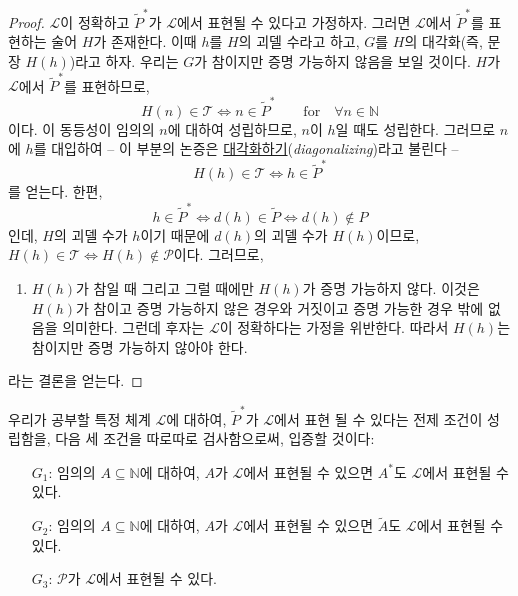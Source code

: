 \documentclass[12pt]{paper}
\begin{document}
  \begin{proof}
    $\mathcal{L}$이 정확하고 $\tilde{P}^{*}$가 $\mathcal{L}$에서 표현될 수 있다고 가정하자.
    그러면 $\mathcal{L}$에서 $\tilde{P}^{*}$를 표현하는 술어 $H$가 존재한다.
    이때 $h$를 $H$의 괴델 수라고 하고,
    $G$를 $H$의 대각화(즉, 문장 $ H \left( h \right) $)라고 하자.
    우리는 $G$가 참이지만 증명 가능하지 않음을 보일 것이다.
    $H$가 $\mathcal{L}$에서 $\tilde{P}^{*}$를 표현하므로,
    $$ H \left( n \right) \in \mathcal{T} \iff n \in \tilde{P}^{*} \qquad \mathrm{for} \quad \forall n \in \mathbb{N} $$이다.
    이 동등성이 임의의 $n$에 대하여 성립하므로,
    $n$이 $h$일 때도 성립한다.
    그러므로 $n$에 $h$를 대입하여 --
    이 부분의 논증은 \underline{대각화하기}(\textit{diagonalizing})라고 불린다 --
    $$ H \left( h \right) \in \mathcal{T} \iff h \in \tilde{P}^{*}$$를 얻는다.
    한편, $$h \in \tilde{P}^{*} \iff d \left( h \right) \in \tilde{P} \iff d \left( h \right) \notin P$$인데,
    $H$의 괴델 수가 $h$이기 때문에 $d \left( h \right)$의 괴델 수가 $H \left( h \right)$이므로,
    $ H \left( h \right) \in \mathcal{T} \iff H \left( h \right) \notin \mathcal{P}$이다.
    그러므로,
    \begin{enumerate}
      \item $H \left( h \right)$가 참일 때 그리고 그럴 때에만 $H \left( h \right)$가 증명 가능하지 않다.
      이것은 $H \left( h \right)$가 참이고 증명 가능하지 않은 경우와 거짓이고 증명 가능한 경우 밖에 없음을 의미한다.
      그런데 후자는 $\mathcal{L}$이 정확하다는 가정을 위반한다.
      따라서 $H \left( h \right)$는 참이지만 증명 가능하지 않아야 한다.
    \end{enumerate}
    라는 결론을 얻는다.
  \end{proof}

  우리가 공부할 특정 체계 $\mathcal{L}$에 대하여,
  $\tilde{P}^{*}$가 $\mathcal{L}$에서 표현 될 수 있다는 전제 조건이 성립함을,
  다음 세 조건을 따로따로 검사함으로써, 입증할 것이다:
  \begin{itemize}
    \item[$G_1$:] 임의의 $A \subseteq \mathbb{N}$에 대하여, $A$가 $\mathcal{L}$에서 표현될 수 있으면 $A^{*}$도 $\mathcal{L}$에서 표현될 수 있다.
    \item[$G_2$:] 임의의 $A \subseteq \mathbb{N}$에 대하여, $A$가 $\mathcal{L}$에서 표현될 수 있으면 $\tilde{A}$도 $\mathcal{L}$에서 표현될 수 있다.
    \item[$G_3$:] $\mathcal{P}$가 $\mathcal{L}$에서 표현될 수 있다.
  \end{itemize}
\end{document}
